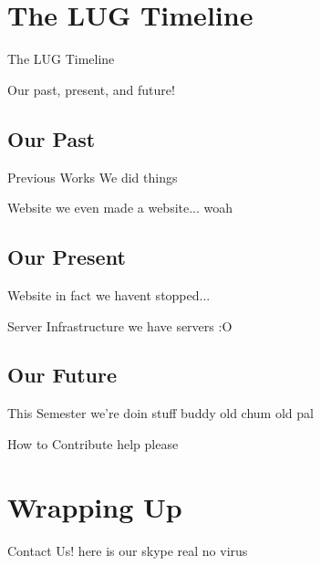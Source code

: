 \documentclass{beamer}
\begin{document}
  \section{The LUG Timeline}
  \begin{frame}

   {\Huge The LUG Timeline}
    
    Our past, present, and future!
  \end{frame}

  \subsection{Our Past}
  \begin{frame}{Previous Works}
    We did things
  \end{frame}

  \begin{frame}{Website}
    we even made a website... woah
  \end{frame}

  \subsection{Our Present}
  \begin{frame}{Website}
    in fact we havent stopped...
  \end{frame}

  \begin{frame}{Server Infrastructure}
    we have servers :O
  \end{frame}

  \subsection{Our Future}
  \begin{frame}{This Semester}
    we're doin stuff buddy old chum old pal
  \end{frame}

  \begin{frame}{How to Contribute}
    help please
  \end{frame}

  \section{Wrapping Up}
  \begin{frame}{Contact Us!}
    here is our skype real no virus
  \end{frame}
\end{document}
